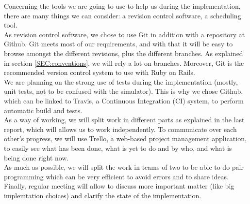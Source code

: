 Concerning the tools we are going to use to help us during the implementation, there are many things we can consider: a revision control software, a scheduling tool.\\
As revision control software, we chose to use Git in addition with a repository at Github. Git meets most of our requirements, and with that it will be easy to browse amongst the different revisions, plus the different branches. As explained in section \vref{SEC:conventions}, we will rely a lot on branches. Moreover, Git is the recommended version control system to use with Ruby on Rails.\\
We are planning on the strong use of tests during the implementation (mostly, unit tests, not to be confused with the simulator). This is why we chose Github, which can be linked to Travis, a Continuous Integration (CI) system, to perform automatic build and tests.\\

As a way of working, we will split work in different parts as explained in the last report, which will allows us to work independently. To communicate over each other's progress, we will use Trello, a web-based project management application, to easily see what has been done, what is yet to do and by who, and what is being done right now.\\

As much as possible, we will split the work in teams of two to be able to do pair programming which can be very efficient to avoid errors and to share ideas.\\
Finally, regular meeting will allow to discuss more important matter (like big implemtation choices) and clarify the state of the implementation.